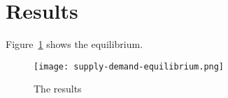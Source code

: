 
\section{Results}

Figure~\ref{fig:equilibrium} shows the equilibrium.

\begin{figure}
	\centering
	\texttt{[image: supply-demand-equilibrium.png]}
	\caption{The results}
	\label{fig:equilibrium}
\end{figure}
